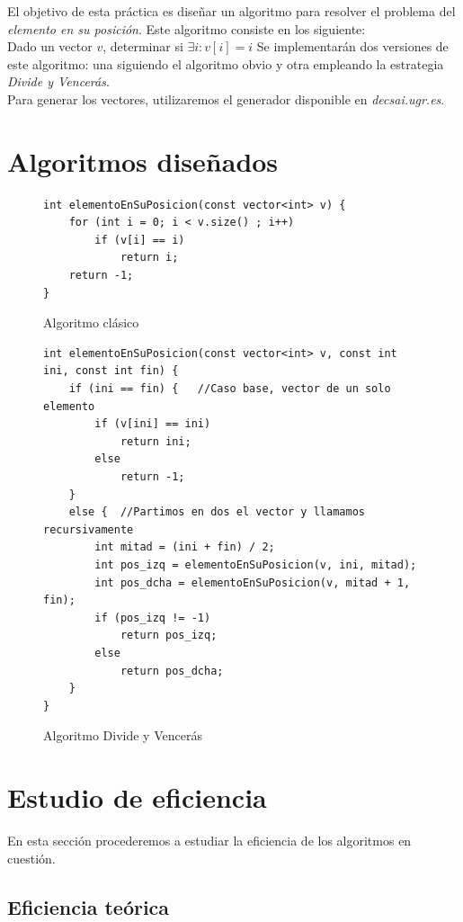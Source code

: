 \documentclass[12pt,spanish]{article}
\begin{document}
El objetivo de esta práctica es diseñar un algoritmo para resolver el problema del \textit{elemento en su posición}. Este algoritmo consiste en los siguiente:\\
Dado un vector $v$, determinar si $\exists i : v[i]=i $
Se implementarán dos versiones de este algoritmo: una siguiendo el algoritmo obvio y otra empleando la estrategia \emph{Divide y Vencerás}. \\

Para generar los vectores, utilizaremos el generador disponible en \textit{decsai.ugr.es}.

\section{Algoritmos diseñados}

\begin{figure}[H]
\begin{verbatim}
int elementoEnSuPosicion(const vector<int> v) {
	for (int i = 0; i < v.size() ; i++)
		if (v[i] == i)
			return i;
	return -1;
}
\end{verbatim}
\caption{Algoritmo clásico}
\label{alg:clasico}
\end{figure}

\begin{figure}[H]
\begin{verbatim}
int elementoEnSuPosicion(const vector<int> v, const int ini, const int fin) {
	if (ini == fin) {	//Caso base, vector de un solo elemento
		if (v[ini] == ini)
			return ini;
		else
			return -1;
	}
	else {	//Partimos en dos el vector y llamamos recursivamente
		int mitad = (ini + fin) / 2;
		int pos_izq = elementoEnSuPosicion(v, ini, mitad);
		int pos_dcha = elementoEnSuPosicion(v, mitad + 1, fin);
		if (pos_izq != -1)
			return pos_izq;
		else
			return pos_dcha;
	}
}	
\end{verbatim}
\caption{Algoritmo Divide y Vencerás}
\label{alg:dyv}
\end{figure}

\newpage

\section{Estudio de eficiencia}

En esta sección procederemos a estudiar la eficiencia de los algoritmos en cuestión.

\subsection{Eficiencia teórica}
\end{document}
